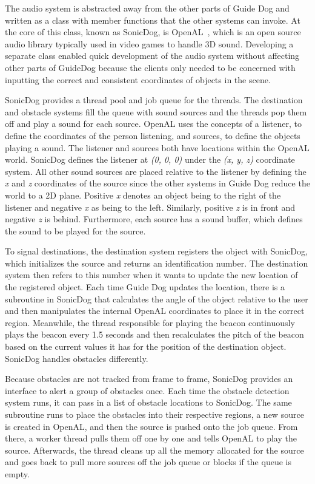 The audio system is abstracted away from the other parts of Guide Dog and
written as a class with member functions that the other systems can invoke. At 
the core of this class, known as SonicDog, is OpenAL~\cite{openal-website}, which
is an open source audio library typically used in video games to handle 3D
sound. Developing a separate class enabled quick development of the audio system
without affecting other parts of GuideDog because the clients only needed to be
concerned with inputting the correct and consistent coordinates of objects in 
the scene.

SonicDog provides a thread pool and job queue for the threads. The destination 
and obstacle systems fill the queue with sound sources and the threads pop them 
off and play a sound for each source. OpenAL uses the concepts of a listener, to 
define the coordinates of the person listening, and sources, to define the 
objects playing a sound. The listener and sources both have locations within the 
OpenAL world. SonicDog defines the listener at \emph{(0, 0, 0)} under the 
\emph{(x, y, z)} coordinate system. All other sound sources are placed relative 
to the listener by defining the \emph{x} and \emph{z} coordinates of the source 
since the other systems in Guide Dog reduce the world to a 2D plane. Positive 
\emph{x} denotes an object being to the right of the listener and negative 
\emph{x} as being to the left. Similarly, positive \emph{z} is in front and 
negative \emph{z} is behind. Furthermore, each source has a sound buffer, which 
defines the sound to be played for the source.

To signal destinations, the destination system registers the object with
SonicDog, which initializes the source and returns an identification number. 
The destination system then refers to this number when it wants to update the
new location of the registered object. Each time Guide Dog updates the location,
there is a subroutine in SonicDog that calculates the angle of the object 
relative to the user and then manipulates the internal OpenAL coordinates to 
place it in the correct region. Meanwhile, the thread responsible for playing 
the beacon continuously plays the beacon every 1.5 seconds and then 
recalculates the pitch of the beacon based on the current values it has for the 
position of the destination object. SonicDog handles obstacles differently.

Because obstacles are not tracked from frame to frame, SonicDog provides an
interface to alert a group of obstacles once. Each time the obstacle detection
system runs, it can pass in a list of obstacle locations to SonicDog. The same
subroutine runs to place the obstacles into their respective regions, a new
source is created in OpenAL, and then the source is pushed onto the job queue.
From there, a worker thread pulls them off one by one and tells OpenAL to play
the source. Afterwards, the thread cleans up all the memory allocated for the
source and goes back to pull more sources off the job queue or blocks if the 
queue is empty.

